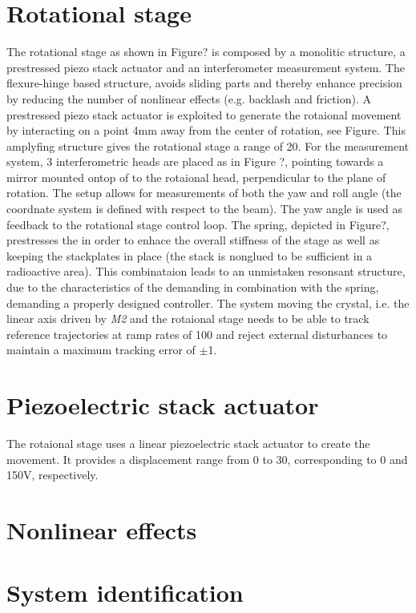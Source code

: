 \section{Rotational stage}
The rotational stage as shown in Figure? is composed by a monolitic structure, a prestressed piezo stack actuator and an interferometer measurement system. The flexure-hinge based structure, avoids sliding parts and thereby enhance precision by reducing the number of nonlinear effects (e.g. backlash and friction). A prestressed piezo stack actuator is exploited to generate the rotaional movement by interacting on a point 4mm away from the center of rotation, see Figure. This amplyfing structure gives the rotational stage a range of \unit{20}{\milli\rad}. For the measurement system, 3 interferometric heads are placed as in Figure ?, pointing towards a mirror mounted ontop of to the rotaional head, perpendicular to the plane of rotation. The setup allows for measurements of both the yaw and roll angle (the coordnate system is defined with respect to the beam). The yaw angle is used as feedback to the rotational stage control loop. The spring, depicted in Figure?, prestresses the \abbrPESA in order to enhace the overall stiffness of the stage as well as keeping the stackplates in place (the stack is nonglued to be sufficient in a radioactive area). This combinataion leads to an unmistaken resonsant structure, due to the characteristics of the \abbrPESA demanding in combination with the spring, demanding a properly designed controller. The system moving the crystal, i.e. the linear axis driven by \emph{M2} and the rotaional stage needs to be able to track reference trajectories at ramp rates of \unit{100}{\micro\radianpersecond} and reject external disturbances to maintain a maximum tracking error of $\pm$\unit{1}{\micro\rad}.

\section{Piezoelectric stack actuator}
The rotaional stage uses a linear piezoelectric stack actuator to create the movement. It provides a displacement range from 0 to \unit{30}{\micro\meter}, corresponding to 0 and 150V, respectively.

\section{Nonlinear effects}

\section{System identification}
